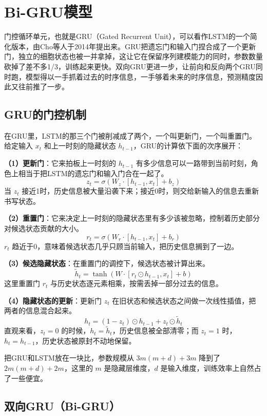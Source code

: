 \documentclass[12pt,a4paper,oneside]{ctexbook}
\begin{document}
	\section{Bi-GRU模型}
	
	门控循环单元，也就是GRU（Gated Recurrent Unit），可以看作LSTM的一个简化版本，由Cho等人于2014年提出来。GRU把遗忘门和输入门捏合成了一个更新门，独立的细胞状态也被一并拿掉，这让它在保留序列建模能力的同时，参数数量砍掉了差不多1/3，训练起来更快。双向GRU更进一步，让前向和反向两个GRU同时跑，模型得以一手抓着过去的时序信息，一手够着未来的时序信息，预测精度因此又往前推了一步。
	
	\subsection{GRU的门控机制}
	
	在GRU里，LSTM的那三个门被削减成了两个，一个叫更新门，一个叫重置门。给定输入 $x_t$ 和上一时刻的隐藏状态 $h_{t-1}$，GRU的计算依下面的次序展开：
	
	\textbf{（1）更新门}：它来拍板上一时刻的 $h_{t-1}$ 有多少信息可以一路带到当前时刻，角色上相当于把LSTM的遗忘门和输入门合在一起了。
	\[
	z_t = \sigma(W_z \cdot [h_{t-1}, x_t] + b_z)
	\]
	当 $z_t$ 接近1时，历史信息被大量沿袭下来；接近0时，则交给新输入的信息去重新书写状态。
	
	\textbf{（2）重置门}：它来决定上一时刻的隐藏状态里有多少该被忽略，控制着历史部分对候选状态贡献的大小。
	\[
	r_t = \sigma(W_r \cdot [h_{t-1}, x_t] + b_r)
	\]
	$r_t$ 趋近于0，意味着候选状态几乎只顾当前输入，把历史信息搁到了一边。
	
	\textbf{（3）候选隐藏状态}：在重置门的调控下，候选状态被计算出来。
	\[
	\tilde{h}_t = \tanh(W \cdot [r_t \odot h_{t-1}, x_t] + b)
	\]
	这里重置门 $r_t$ 与历史状态逐元素相乘，按需丢掉一部分过去的信息。
	
	\textbf{（4）隐藏状态的更新}：更新门 $z_t$ 在旧状态和候选状态之间做一次线性插值，把两者的信息混合起来。
	\[
	h_t = (1 - z_t) \odot h_{t-1} + z_t \odot \tilde{h}_t
	\]
	直观来看，$z_t = 0$ 的时候，$h_t = \tilde{h}_t$，历史信息被全部清零；而 $z_t = 1$ 时，$h_t = h_{t-1}$，历史状态被原封不动地保留。
	
	把GRU和LSTM放在一块比，参数规模从 $3m(m+d)+3m$ 降到了 $2m(m+d)+2m$，这里的 $m$ 是隐藏层维度，$d$ 是输入维度，训练效率上自然占了一些便宜。
	
	\subsection{双向GRU（Bi-GRU）}
	
\end{document}
